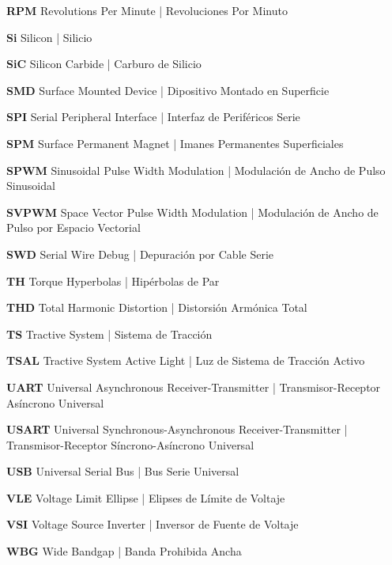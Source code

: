 \textbf{RPM} Revolutions Per Minute | Revoluciones Por Minuto

\textbf{Si} Silicon | Silicio

\textbf{SiC} Silicon Carbide | Carburo de Silicio

\textbf{SMD} Surface Mounted Device | Dipositivo Montado en Superficie

\textbf{SPI} Serial Peripheral Interface | Interfaz de Periféricos Serie

\textbf{SPM} Surface Permanent Magnet | Imanes Permanentes Superficiales

\textbf{SPWM} Sinusoidal Pulse Width Modulation | Modulación de Ancho de Pulso Sinusoidal

\textbf{SVPWM} Space Vector Pulse Width Modulation | Modulación de Ancho de Pulso por Espacio Vectorial

\textbf{SWD} Serial Wire Debug | Depuración por Cable Serie

\textbf{TH} Torque Hyperbolas | Hipérbolas de Par

\textbf{THD} Total Harmonic Distortion | Distorsión Armónica Total

\textbf{TS} Tractive System | Sistema de Tracción

\textbf{TSAL} Tractive System Active Light | Luz de Sistema de Tracción Activo

\textbf{UART} Universal Asynchronous Receiver-Transmitter | Transmisor-Receptor Asíncrono Universal

\textbf{USART} Universal Synchronous-Asynchronous Receiver-Transmitter | Transmisor-Receptor Síncrono-Asíncrono Universal

\textbf{USB} Universal Serial Bus | Bus Serie Universal

\textbf{VLE} Voltage Limit Ellipse | Elipses de Límite de Voltaje

\textbf{VSI} Voltage Source Inverter | Inversor de Fuente de Voltaje

\textbf{WBG} Wide Bandgap | Banda Prohibida Ancha